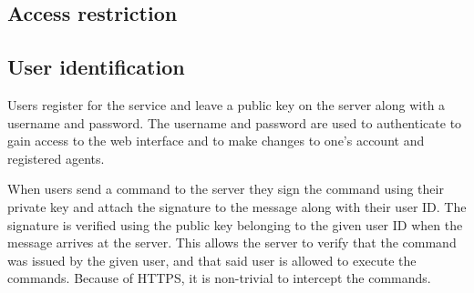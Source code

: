 \subsection{Access restriction}

\subsection{User identification}
Users register for the service and leave a public key on the server along with a username and password.
The username and password are used to authenticate to gain access to the web interface and to make changes to one's account and registered agents.

When users send a command to the server they sign the command using their private key and attach the signature to the message along with their user ID.
The signature is verified using the public key belonging to the given user ID when the message arrives at the server.
This allows the server to verify that the command was issued by the given user, and that said user is allowed to execute the commands.
Because of HTTPS, it is non-trivial to intercept the commands. 



